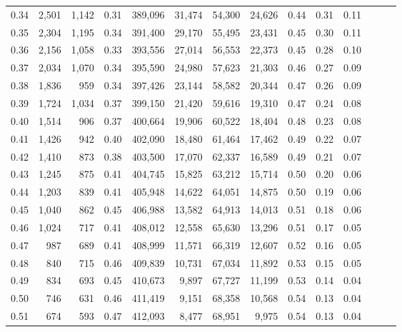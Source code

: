 \begin{tabular}{rrrrrrrrrrrrrr}
0.34 &   2,501 &  1,142 &  0.31 &  389,096 &   31,474 &  54,300 &  24,626 &  0.44 &  0.31 &      0.11 \\
0.35 &   2,304 &  1,195 &  0.34 &  391,400 &   29,170 &  55,495 &  23,431 &  0.45 &  0.30 &      0.11 \\
0.36 &   2,156 &  1,058 &  0.33 &  393,556 &   27,014 &  56,553 &  22,373 &  0.45 &  0.28 &      0.10 \\
0.37 &   2,034 &  1,070 &  0.34 &  395,590 &   24,980 &  57,623 &  21,303 &  0.46 &  0.27 &      0.09 \\
0.38 &   1,836 &    959 &  0.34 &  397,426 &   23,144 &  58,582 &  20,344 &  0.47 &  0.26 &      0.09 \\
0.39 &   1,724 &  1,034 &  0.37 &  399,150 &   21,420 &  59,616 &  19,310 &  0.47 &  0.24 &      0.08 \\
0.40 &   1,514 &    906 &  0.37 &  400,664 &   19,906 &  60,522 &  18,404 &  0.48 &  0.23 &      0.08 \\
0.41 &   1,426 &    942 &  0.40 &  402,090 &   18,480 &  61,464 &  17,462 &  0.49 &  0.22 &      0.07 \\
0.42 &   1,410 &    873 &  0.38 &  403,500 &   17,070 &  62,337 &  16,589 &  0.49 &  0.21 &      0.07 \\
0.43 &   1,245 &    875 &  0.41 &  404,745 &   15,825 &  63,212 &  15,714 &  0.50 &  0.20 &      0.06 \\
0.44 &   1,203 &    839 &  0.41 &  405,948 &   14,622 &  64,051 &  14,875 &  0.50 &  0.19 &      0.06 \\
0.45 &   1,040 &    862 &  0.45 &  406,988 &   13,582 &  64,913 &  14,013 &  0.51 &  0.18 &      0.06 \\
0.46 &   1,024 &    717 &  0.41 &  408,012 &   12,558 &  65,630 &  13,296 &  0.51 &  0.17 &      0.05 \\
0.47 &     987 &    689 &  0.41 &  408,999 &   11,571 &  66,319 &  12,607 &  0.52 &  0.16 &      0.05 \\
0.48 &     840 &    715 &  0.46 &  409,839 &   10,731 &  67,034 &  11,892 &  0.53 &  0.15 &      0.05 \\
0.49 &     834 &    693 &  0.45 &  410,673 &    9,897 &  67,727 &  11,199 &  0.53 &  0.14 &      0.04 \\
0.50 &     746 &    631 &  0.46 &  411,419 &    9,151 &  68,358 &  10,568 &  0.54 &  0.13 &      0.04 \\
0.51 &     674 &    593 &  0.47 &  412,093 &    8,477 &  68,951 &   9,975 &  0.54 &  0.13 &      0.04 \\

\end{tabular}
